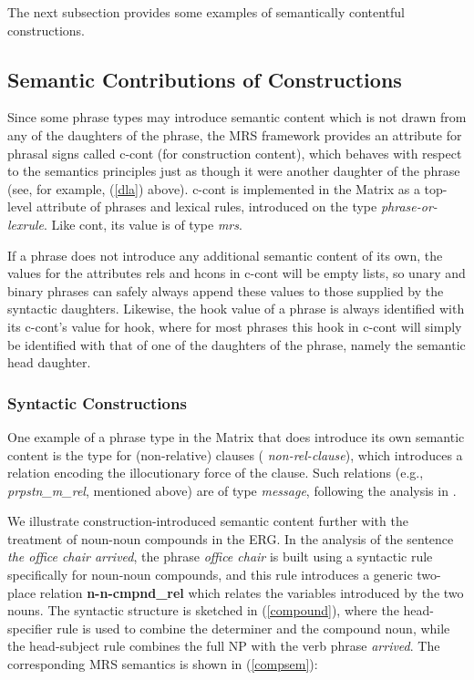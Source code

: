 \documentclass[12pt]{article}
\begin{document}
The next subsection provides some examples of semantically
contentful constructions.

\subsection{Semantic Contributions of Constructions}
\label{ccontsec}

Since some phrase types may introduce semantic content which is not
drawn from any of the daughters of the phrase, the MRS framework
provides an attribute for phrasal signs called {\sc c-cont} (for
construction content), which behaves with respect to the semantics
principles just as though it were another daughter of the phrase (see,
for example, (\ref{dla}) above).  {\sc c-cont} is implemented in the
Matrix as a top-level attribute of phrases and lexical rules,
introduced on the type {\it phrase-or-lexrule}.  Like {\sc cont}, its
value is of type {\it mrs}.  

If a phrase does not introduce any additional semantic content of its
own, the values for the attributes {\sc rels} and {\sc hcons} in {\sc
c-cont} will be empty lists, so unary and binary phrases can safely
always append these values to those supplied by the syntactic
daughters.  Likewise, the {\sc hook} value of a phrase is always
identified with its {\sc c-cont}'s value for {\sc hook}, where for
most phrases this {\sc hook} in {\sc c-cont} will simply be identified
with that of one of the daughters of the phrase, namely the semantic
head daughter.

\subsubsection{Syntactic Constructions}

One example of a phrase type in the Matrix that does introduce its own
semantic content is the type for (non-relative) clauses ({\it
non-rel-clause}), which introduces a relation encoding the
illocutionary force of the clause.  Such relations (e.g., {\it
prpstn\_m\_rel}, mentioned above) are of type {\it message}, following the
analysis in \cite{Gin:Sag:00}.

We illustrate construction-introduced semantic content further with
the treatment of noun-noun compounds in the ERG.  In the analysis of the sentence {\it the office chair
arrived}, the phrase {\it office chair} is built using a syntactic
rule specifically for noun-noun compounds, and this rule introduces a
generic two-place relation {\bf n-n-cmpnd\_rel} which relates the variables
introduced by the two nouns.  The syntactic structure is sketched in
(\ref{compound}), where the head-specifier rule is used to combine the
determiner and the compound noun, while the head-subject rule combines
the full NP with the verb phrase {\it arrived}.  The corresponding MRS
semantics is shown in (\ref{compsem}):
\end{document}
